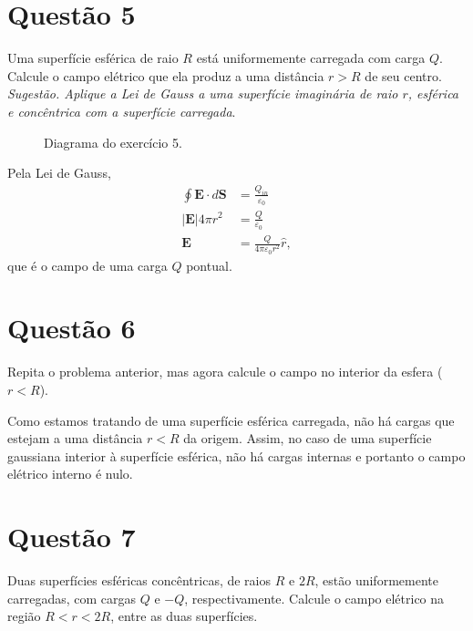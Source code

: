 \documentclass[11pt]{article}
\begin{document}
\section{Questão 5}
\label{sec:org06dc614}
Uma superfície esférica de raio \(R\) está uniformemente carregada com
carga \(Q\). Calcule o campo elétrico que ela produz a uma distância \(r>R\)
de seu centro. \emph{Sugestão. Aplique a Lei de Gauss a uma superfície}
\emph{imaginária de raio \(r\), esférica e concêntrica com a superfície} 
\emph{carregada}.

\begin{figure}[h!]
  \centering
  \caption{Diagrama do exercício 5.}
  \label{fig:ex-5}
\end{figure}

Pela Lei de Gauss,
\begin{align*}
  \oint \mathbf E\cdot d\mathbf S &= \frac{Q_{in}}{\varepsilon_0}\\
  |\mathbf E| 4\pi r^2  &= \frac{Q}{\varepsilon_0}\\
  \mathbf E &=  \frac{Q}{4\pi\varepsilon_0r^2}\hat r,
\end{align*}
que é o campo de uma carga $Q$ pontual.
\section{Questão 6}
\label{sec:org4f5f7f9}
Repita o problema anterior, mas agora calcule o campo no interior da
esfera (\(r<R\)).

Como estamos tratando de uma superfície esférica carregada, não há
cargas que estejam a uma distância \(r<R\) da origem. Assim, no caso de
uma superfície gaussiana interior à superfície esférica, não há cargas
internas e portanto o campo elétrico interno é nulo.

\section{Questão 7}
\label{sec:orgce1bade}
Duas superfícies esféricas concêntricas, de raios \(R\) e \(2R\), estão
uniformemente carregadas, com cargas \(Q\) e \(-Q\),
respectivamente. Calcule o campo elétrico na região \(R<r<2R\), entre as
duas superfícies. 
\end{document}
